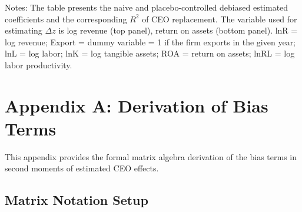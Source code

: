 \documentclass[11pt,a4paper]{article}
\newcommand{\tablepath}{papers/econometrics/table}
\begin{document}
\begin{table}
    \centering
    \caption{Analysis of Variance -- Naive and Placebo-Controlled Debiased Methods }
    \vspace{.2cm}
    \label{tab:table_application}
    
    
    \begin{minipage}{16cm}
    \vspace{.2cm}
    \footnotesize{Notes: The table presents the naive and placebo-controlled debiased estimated coefficients and the corresponding $R^2$ of CEO replacement. The variable used for estimating $\Delta z$ is log revenue (top panel), return on assets (bottom panel). lnR = log revenue; Export = dummy variable = 1 if the firm exports in the given year; lnL = log labor; lnK = log tangible assets; ROA = return on assets; lnRL = log labor productivity.}
    \end{minipage}
\end{table}

\clearpage

\section*{Appendix A: Derivation of Bias Terms}\label{sec: appA}

\setcounter{equation}{0}
\renewcommand{\theequation}{A\arabic{equation}}

This appendix provides the formal matrix algebra derivation of the bias terms in second moments of estimated CEO effects.

\subsection{Matrix Notation Setup}
\end{document}
